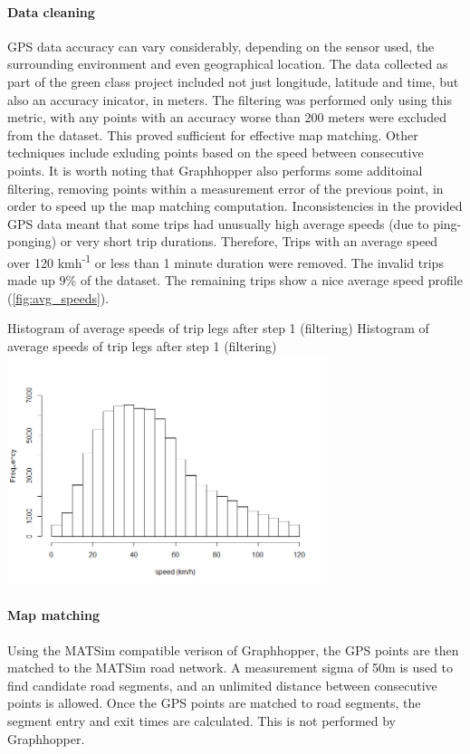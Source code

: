 \paragraph{Data cleaning}
GPS data accuracy can vary considerably, depending on the sensor used, the surrounding environment and even geographical location. 
The data collected as part of the green class project included not just longitude, latitude and time, but also an accuracy inicator, in meters. 
The filtering was performed only using this metric, with any points with an accuracy worse than 200 meters were excluded from the dataset. 
This proved sufficient for effective map matching. Other techniques include exluding points based on the speed between consecutive points. 
It is worth noting that Graphhopper also performs some additoinal filtering, removing points within a measurement error of the previous point, in order to speed up the map matching computation. Inconsistencies in the provided GPS data meant that some trips had unusually high average speeds (due to ping-ponging) or very short trip durations. Therefore, Trips with an average speed over 120 kmh\textsuperscript{-1} or less than 1 minute duration were removed. The invalid trips made up 9\% of the dataset. The remaining trips show a nice average speed profile (\ref{fig:avg_speeds}).

\createfigure%
	{Histogram of average speeds of trip legs after step 1 (filtering)}
	{Histogram of average speeds of trip legs after step 1 (filtering)}
    {\label{fig:avg_speeds}}
    {\includegraphics[width=0.7\textwidth]{figures/avg_speed_green_class_matched}}
	{}

\paragraph{Map matching}
Using the MATSim compatible verison of Graphhopper, the GPS points are then matched to the MATSim road network. A measurement sigma of 50m is used to find candidate road segments, and an unlimited distance between consecutive points is allowed. Once the GPS points are matched to road segments, the segment entry and exit times are calculated. This is not performed by Graphhopper.  

